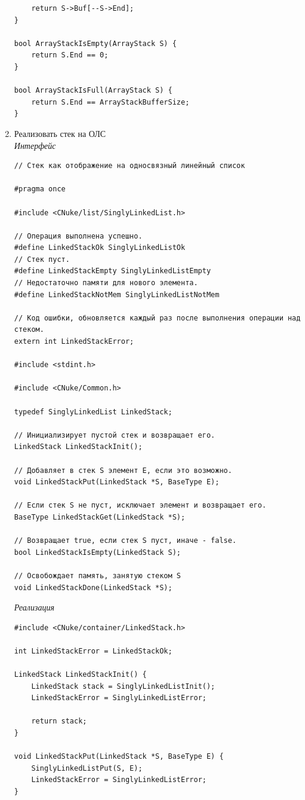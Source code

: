 \documentclass[a4paper,14pt]{extarticle}
\begin{document}
\begin{enumerate}
\begin{verbatim}
    return S->Buf[--S->End];
}

bool ArrayStackIsEmpty(ArrayStack S) {
    return S.End == 0;
}

bool ArrayStackIsFull(ArrayStack S) {
    return S.End == ArrayStackBufferSize;
}
    \end{verbatim}
    \item Реализовать стек на ОЛС\\
	\textit{Интерфейс}
    \begin{verbatim}
// Стек как отображение на односвязный линейный список

#pragma once

#include <CNuke/list/SinglyLinkedList.h>

// Операция выполнена успешно.
#define LinkedStackOk SinglyLinkedListOk
// Стек пуст.
#define LinkedStackEmpty SinglyLinkedListEmpty
// Недостаточно памяти для нового элемента.
#define LinkedStackNotMem SinglyLinkedListNotMem

// Код ошибки, обновляется каждый раз после выполнения операции над стеком.
extern int LinkedStackError;

#include <stdint.h>

#include <CNuke/Common.h>

typedef SinglyLinkedList LinkedStack;

// Инициализирует пустой стек и возвращает его.
LinkedStack LinkedStackInit();

// Добавляет в стек S элемент E, если это возможно.
void LinkedStackPut(LinkedStack *S, BaseType E);

// Если стек S не пуст, исключает элемент и возвращает его.
BaseType LinkedStackGet(LinkedStack *S);

// Возвращает true, если стек S пуст, иначе - false.
bool LinkedStackIsEmpty(LinkedStack S);

// Освобождает память, занятую стеком S
void LinkedStackDone(LinkedStack *S);
    \end{verbatim}
    \textit{Реализация}
\begin{verbatim}
#include <CNuke/container/LinkedStack.h>

int LinkedStackError = LinkedStackOk;

LinkedStack LinkedStackInit() {
    LinkedStack stack = SinglyLinkedListInit();
    LinkedStackError = SinglyLinkedListError;
    
    return stack;
}

void LinkedStackPut(LinkedStack *S, BaseType E) {
    SinglyLinkedListPut(S, E);
    LinkedStackError = SinglyLinkedListError;
}


\end{verbatim}
\end{enumerate}
\end{document}
